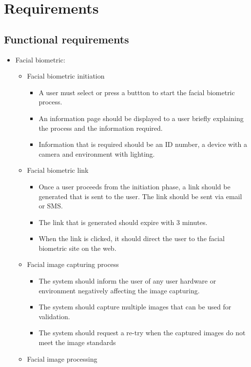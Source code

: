\documentclass{article}
\begin{document}
\section{Requirements}
\subsection{Functional requirements}
\begin{itemize}
 \item Facial biometric: 
    \begin{itemize}
        \item Facial biometric initiation
        \begin{itemize}
            \item A user must select or press a buttton to start the facial biometric process.
            \item An information page should be displayed to a user briefly explaining the process and the information required.
            \item Information that is required should be an ID number, a device with a camera and environment with lighting.
        \end{itemize}
        \item Facial biometric link 
        \begin{itemize}
            \item Once a user proceeds from the initiation phase, a link should be generated that is sent to the user. The link should be sent via email or SMS.
            \item The link that is generated should expire with 3 minutes. 
            \item When the link is clicked, it should direct the user to the facial biometric site on the web.
        \end{itemize}
        \item Facial image capturing process 
        \begin{itemize}
            \item The system should inform the user of any user hardware or environment negatively affecting the image capturing.
            \item The system should capture multiple images that can be used for validation.
            \item The system should request a re-try when the captured images do not meet the image standards
        \end{itemize}
        \item Facial image processing

\end{itemize}
\end{itemize}
\end{document}
